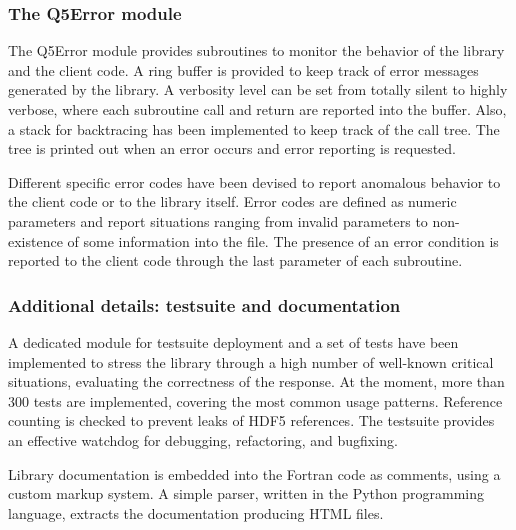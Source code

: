 \subsubsection*{The Q5Error module}

The Q5Error module provides subroutines to monitor the behavior of the
library and the client code. A ring buffer is provided to keep track of
error messages generated by the library. A verbosity level can be set from
totally silent to highly verbose, where each subroutine call and return are
reported into the buffer. Also, a stack for backtracing has been implemented
to keep track of the call tree. The tree is printed out when an error occurs
and error reporting is requested. 

Different specific error codes have been devised to report anomalous
behavior to the client code or to the library itself. Error codes are
defined as numeric parameters and report situations ranging from invalid
parameters to non-existence of some information into the file. The presence
of an error condition is reported to the client code through the last
parameter of each subroutine.

\subsubsection*{Additional details: testsuite and documentation}

A dedicated module for testsuite deployment and a set of tests have been
implemented to stress the library through a high number of well-known
critical situations, evaluating the correctness of the response. At the
moment, more than 300 tests are implemented, covering the most common usage
patterns. Reference counting is checked to prevent leaks of HDF5
references. The testsuite provides an effective watchdog for debugging,
refactoring, and bugfixing.

Library documentation is embedded into the Fortran code as comments,
using a custom markup system.  A simple parser, written in the
Python\cite{python-site} programming language, extracts the documentation
producing HTML files.

